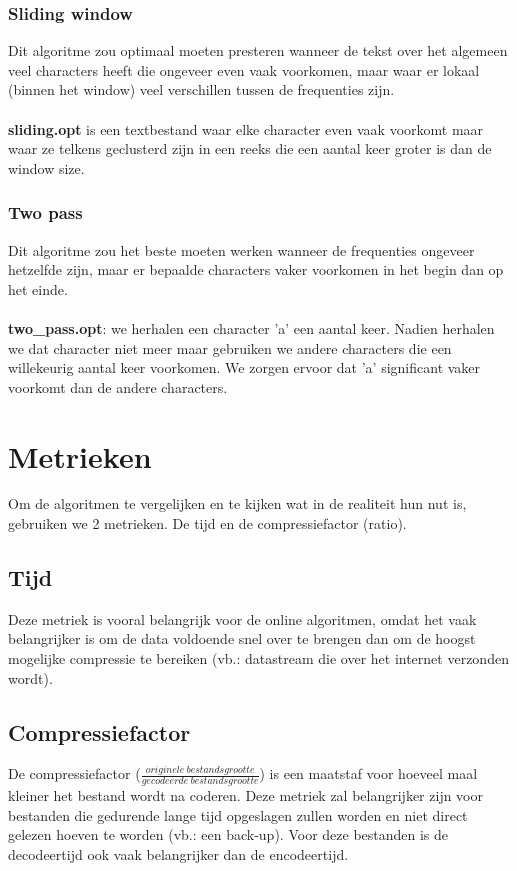 \documentclass[a4paper,12pt]{report}
\begin{document}
\subsection{Sliding window}
Dit algoritme zou optimaal moeten presteren wanneer de tekst over het algemeen veel characters heeft die ongeveer even vaak voorkomen, maar waar er lokaal (binnen het window) veel verschillen tussen de frequenties zijn. \\ \\
\textbf{sliding.opt} is een textbestand waar elke character even vaak voorkomt maar waar ze telkens geclusterd zijn in een reeks die een aantal keer groter is dan de window size.
\subsection{Two pass}
Dit algoritme zou het beste moeten werken wanneer de frequenties ongeveer hetzelfde zijn, maar er bepaalde characters vaker voorkomen in het begin dan op het einde. \\ \\
\textbf{two\_pass.opt}: we herhalen een character 'a' een aantal keer. Nadien herhalen we dat character niet meer maar gebruiken we andere characters die een willekeurig aantal keer voorkomen. We zorgen ervoor dat 'a' significant vaker voorkomt dan de andere characters.
\chapter{Metrieken}
Om de algoritmen te vergelijken en te kijken wat in de realiteit hun nut is, gebruiken we 2 metrieken. De tijd en de compressiefactor (ratio).
\section{Tijd}
Deze metriek is vooral belangrijk voor de online algoritmen, omdat het vaak belangrijker is om de data voldoende snel over te brengen dan om de hoogst mogelijke compressie te bereiken (vb.: datastream die over het internet verzonden wordt).

\section{Compressiefactor}
De compressiefactor ($\frac{originele~bestandsgrootte}{gecodeerde~bestandsgrootte}$) is een maatstaf voor hoeveel maal kleiner het bestand wordt na coderen. Deze metriek zal belangrijker zijn voor bestanden die gedurende lange tijd opgeslagen zullen worden en niet direct gelezen hoeven te worden (vb.: een back-up). Voor deze bestanden is de decodeertijd ook vaak belangrijker dan de encodeertijd.
\end{document}
